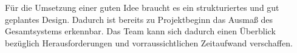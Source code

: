 
Für die Umsetzung einer guten Idee braucht es ein strukturiertes und gut geplantes Design. Dadurch ist bereits zu Projektbeginn das Ausmaß des Gesamtsystems erkennbar. Das Team kann sich dadurch einen Überblick bezüglich Herausforderungen und vorraussichtlichen Zeitaufwand verschaffen.
